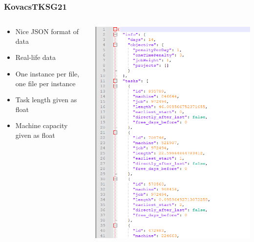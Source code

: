 \documentclass[dvipsnames,aspectratio=169]{beamer}
\begin{document}
\begin{frame}
\frametitle{KovacsTKSG21~\cite{KovacsTKSG21}}
\begin{columns}
\begin{column}{0.5\textwidth}
\begin{itemize}
\item Nice JSON format of data
\item Real-life data
\item One instance per file, one file per instance
\item Task length given as float
\item Machine capacity given as float
\end{itemize}
\end{column}
\begin{column}{0.5\textwidth}
\includegraphics[width=\textwidth]{images/KovacsTKSG21}
\end{column}
\end{columns}
\end{frame}
\end{document}
